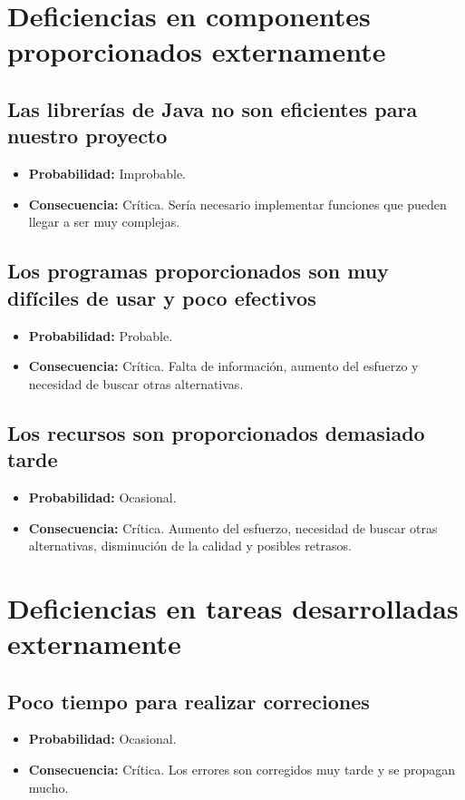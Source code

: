 \documentclass[spanish,a4paper,11pt, twoside]{report}	%
\begin{document}
%
\section{Deficiencias en componentes proporcionados externamente}

	\subsection*{Las librerías de Java no son eficientes para nuestro proyecto}	
		\begin{itemize}
			\item \textbf {Probabilidad: }Improbable.
			\item \textbf {Consecuencia: }Crítica. Sería necesario implementar funciones que pueden llegar a ser muy complejas.
		\end{itemize}
	
	\subsection*{Los programas proporcionados son muy difíciles de usar y poco efectivos}	
		\begin{itemize}
			\item \textbf {Probabilidad: }Probable.
			\item \textbf {Consecuencia: }Crítica. Falta de información, aumento del esfuerzo y necesidad de buscar otras alternativas.
		\end{itemize}
	
	\subsection*{Los recursos son proporcionados demasiado tarde}	
		\begin{itemize}
			\item \textbf {Probabilidad: }Ocasional.
			\item \textbf {Consecuencia: }Crítica. Aumento del esfuerzo, necesidad de buscar otras alternativas, disminución de la calidad y posibles retrasos.
		\end{itemize}

%
\section{Deficiencias en tareas desarrolladas externamente}

	\subsection*{Poco tiempo para realizar correciones}	
		\begin{itemize}
			\item \textbf {Probabilidad: }Ocasional.
			\item \textbf {Consecuencia: }Crítica. Los errores son corregidos muy tarde y se propagan mucho.
		\end{itemize}
\end{document}
